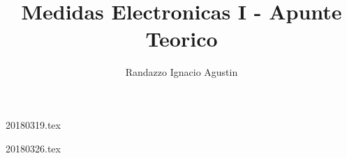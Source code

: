 

\title{Medidas Electronicas I - Apunte Teorico}
\author{Randazzo Ignacio Agustin}


\maketitle
\tableofcontents

{20180319.tex}

{20180326.tex}



